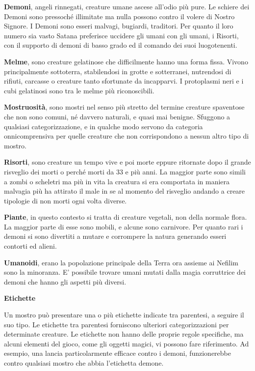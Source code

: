 \documentclass[12pt,a4paper,twoside,openany]{book}
\begin{document}
\begin{multicols}{2}
\smallskip\textbf{Demoni}, angeli rinnegati, creature umane ascese all'odio più pure. Le schiere dei Demoni sono pressoché illimitate ma nulla possono contro il volere di Nostro Signore. I Demoni sono esseri malvagi, bugiardi, traditori. Per quanto il loro numero sia vasto Satana preferisce uccidere gli umani con gli umani, i Risorti, con il supporto di demoni di basso grado ed il comando dei suoi luogotenenti.

\smallskip\textbf{Melme}, sono creature gelatinose che difficilmente hanno una forma fissa. Vivono principalmente sottoterra, stabilendosi in grotte e sotterranei, nutrendosi di rifiuti, carcasse o creature tanto sfortunate da incapparvi. I protoplasmi neri e i cubi gelatinosi sono tra le melme più riconoscibili.

\smallskip\textbf{Mostruosità}, sono mostri nel senso più stretto del termine creature spaventose che non sono comuni, né davvero naturali, e quasi mai benigne. 
Sfuggono a qualsiasi categorizzazione, e in qualche modo servono da categoria onnicomprensiva per quelle creature che non corrispondono a nessun altro tipo di mostro.

\smallskip\textbf{Risorti}, sono creature un tempo vive e poi morte eppure ritornate dopo il grande risveglio dei morti o perché morti da 33 e più anni. La maggior parte sono simili a zombi o scheletri ma più in vita la creatura si era comportata in maniera malvagia più ha attirato il male in se al momento del risveglio andando a creare tipologie di non morti ogni volta diverse.

\smallskip\textbf{Piante}, in questo contesto si tratta di creature vegetali, non della normale flora. La maggior parte di esse sono mobili, e alcune sono carnivore. Per quanto rari i demoni si sono divertiti a mutare e corrompere la natura generando esseri contorti ed alieni.

\smallskip\textbf{Umanoidi}, erano la popolazione principale della Terra ora assieme ai Nefilim sono la minoranza. E' possibile trovare umani mutati dalla magia corruttrice dei demoni che hanno gli aspetti più diversi.

\medskip



\medskip\textbf{Etichette}

Un mostro può presentare una o più etichette indicate tra parentesi, a seguire il suo tipo.  Le etichette tra parentesi forniscono ulteriori categorizzazioni per determinate creature. Le etichette non hanno delle proprie regole specifiche, ma alcuni elementi del gioco, come gli oggetti magici, vi possono fare riferimento. Ad esempio, una lancia particolarmente efficace contro i demoni, funzionerebbe contro qualsiasi mostro che abbia l'etichetta demone.



\end{multicols}
\end{document}
